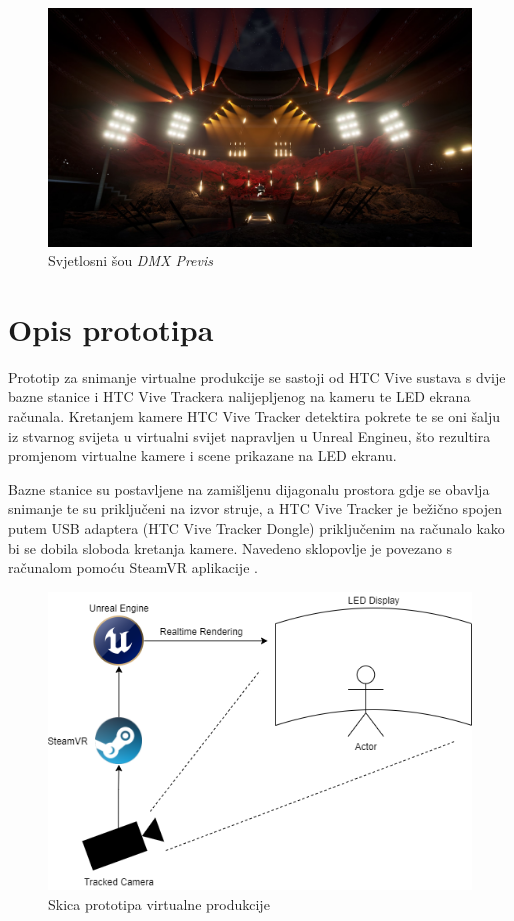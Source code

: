 \documentclass[times, utf8, zavrsni, numeric]{fer}
\begin{document}
\begin{figure}[htp]
	\centering
	\includegraphics[width=\linewidth]{slika 2-4.png}
	\caption{Svjetlosni šou \emph{DMX Previs} \cite{dmx_previs}}
	\label{fig:slika 2-4}
\end{figure}

\pagebreak

\section{Opis prototipa}
Prototip za snimanje virtualne produkcije se sastoji od HTC Vive sustava s dvije bazne stanice i HTC Vive Trackera nalijepljenog na kameru te LED ekrana računala. Kretanjem kamere HTC Vive Tracker detektira pokrete te se oni šalju iz stvarnog svijeta u virtualni svijet napravljen u Unreal Engineu, što rezultira promjenom virtualne kamere i scene prikazane na LED ekranu.\newline

Bazne stanice su postavljene na zamišljenu dijagonalu prostora gdje se obavlja snimanje te su priključeni na izvor struje, a HTC Vive Tracker je bežično spojen putem USB adaptera (HTC Vive Tracker Dongle) priključenim na računalo kako bi se dobila sloboda kretanja kamere. Navedeno sklopovlje je povezano s računalom pomoću SteamVR aplikacije \cite{vp}.\\

\begin{figure}[htp]
	\centering
	\includegraphics[width=\linewidth]{slika 2-5.png}
	\caption{Skica prototipa virtualne produkcije}
	\label{fig:slika 2-5}
\end{figure}
\end{document}
